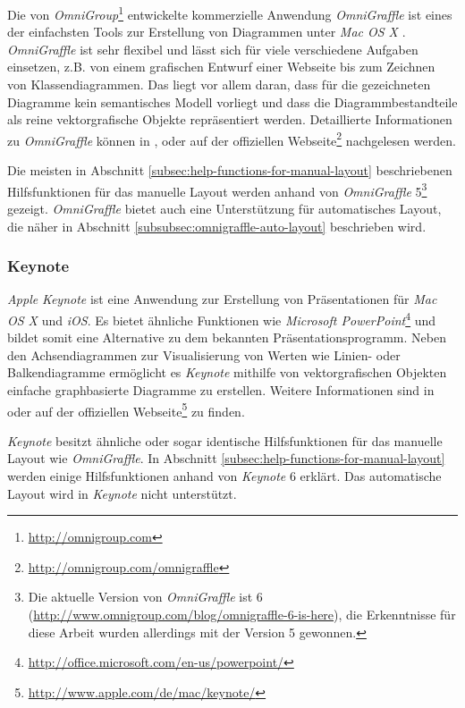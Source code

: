 Die von \textit{OmniGroup}\footnote{\url{http://omnigroup.com}} entwickelte kommerzielle Anwendung \textit{OmniGraffle} ist eines der einfachsten Tools zur Erstellung von Diagrammen unter \textit{Mac OS X} \cite{Olsen10OmniGraffle}. \textit{OmniGraffle} ist sehr flexibel und lässt sich für viele verschiedene Aufgaben einsetzen, z.B. von einem grafischen Entwurf einer Webseite bis zum Zeichnen von Klassendiagrammen. Das liegt vor allem daran, dass für die gezeichneten Diagramme kein semantisches Modell vorliegt und dass die Diagrammbestandteile als reine vektorgrafische Objekte repräsentiert werden. Detaillierte Informationen zu \textit{OmniGraffle} können in \cite{08OmniGraffle}, \cite{Olsen10OmniGraffle} oder auf der offiziellen Webseite\footnote{\url{http://omnigroup.com/omnigraffle}} nachgelesen werden.

Die meisten in Abschnitt \ref{subsec:help-functions-for-manual-layout} beschriebenen Hilfsfunktionen für das manuelle Layout werden anhand von \textit{OmniGraffle} 5\footnote{Die aktuelle Version von \textit{OmniGraffle} ist 6 (\url{http://www.omnigroup.com/blog/omnigraffle-6-is-here}), die Erkenntnisse für diese Arbeit wurden allerdings mit der Version 5 gewonnen.} gezeigt. \textit{OmniGraffle} bietet auch eine Unterstützung für automatisches Layout, die näher in Abschnitt \ref{subsubsec:omnigraffle-auto-layout} beschrieben wird.

\subsubsection{Keynote}
\label{subsubsec:keynote}

\textit{Apple} \textit{Keynote} ist eine Anwendung zur Erstellung von Präsentationen für \textit{Mac OS X} und \textit{iOS}. Es bietet ähnliche Funktionen wie \textit{Microsoft PowerPoint}\footnote{\url{http://office.microsoft.com/en-us/powerpoint/}} und bildet somit eine Alternative zu dem bekannten Präsentationsprogramm. Neben den Achsendiagrammen zur Visualisierung von Werten wie Linien- oder Balkendiagramme ermöglicht es \textit{Keynote} mithilfe von vektorgrafischen Objekten einfache graphbasierte Diagramme zu erstellen. Weitere Informationen sind in \cite{11Keynote} oder auf der offiziellen Webseite\footnote{\url{http://www.apple.com/de/mac/keynote/}} zu finden. 

\textit{Keynote} besitzt ähnliche oder sogar identische Hilfsfunktionen für das manuelle Layout wie \textit{OmniGraffle}. In Abschnitt \ref{subsec:help-functions-for-manual-layout} werden einige Hilfsfunktionen anhand von \textit{Keynote} 6 erklärt. Das automatische Layout wird in \textit{Keynote} nicht unterstützt.

